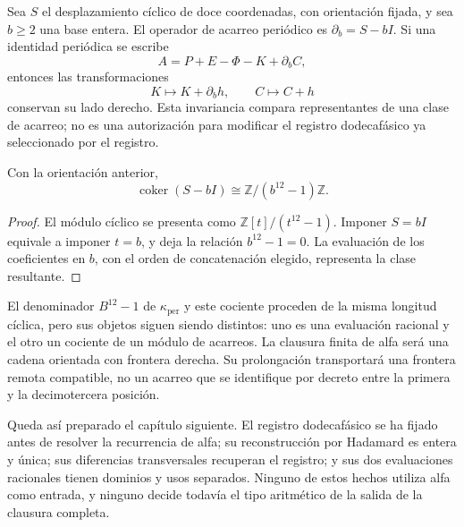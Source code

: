 Sea \(S\) el desplazamiento cíclico de doce coordenadas, con orientación
fijada, y sea \(b\geq2\) una base entera. El operador de acarreo
periódico es \(\partial_b=S-bI\). Si una identidad periódica se escribe
\[
 A=P+E-\Phi-K+\partial_bC,
\]
entonces las transformaciones
\[
 K\longmapsto K+\partial_bh,\qquad C\longmapsto C+h
\]
conservan su lado derecho. Esta invariancia compara representantes de una
clase de acarreo; no es una autorización para modificar el registro dodecafásico ya
seleccionado por el registro.

\begin{proposition}
\label{prop:k-cociente-acarreo}
Con la orientación anterior,
\[
 \operatorname{coker}(S-bI)\cong\mathbb Z/(b^{12}-1)\mathbb Z.
\]
\end{proposition}

\begin{proof}
El módulo cíclico se presenta como
\(\mathbb Z[t]/(t^{12}-1)\). Imponer \(S=bI\) equivale a imponer
\(t=b\), y deja la relación \(b^{12}-1=0\). La evaluación de los
coeficientes en \(b\), con el orden de concatenación elegido, representa
la clase resultante.
\end{proof}

El denominador \(B^{12}-1\) de \(\kappa_{\mathrm{per}}\) y este
cociente proceden de la misma longitud cíclica, pero sus objetos siguen
siendo distintos: uno es una evaluación racional y el otro un cociente
de un módulo de acarreos. La clausura finita de alfa será una cadena
orientada con frontera derecha. Su prolongación transportará una
frontera remota compatible, no un acarreo que se identifique por decreto
entre la primera y la decimotercera posición.

Queda así preparado el capítulo siguiente. El registro dodecafásico se ha fijado antes
de resolver la recurrencia de alfa; su reconstrucción por Hadamard es
entera y única; sus diferencias transversales recuperan el registro; y
sus dos evaluaciones racionales tienen dominios y usos separados. Ninguno
de estos hechos utiliza alfa como entrada, y ninguno decide todavía el
tipo aritmético de la salida de la clausura completa.
